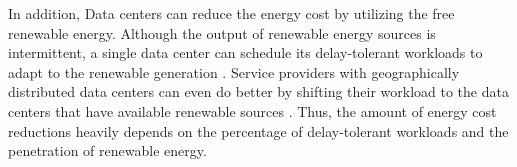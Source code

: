 In addition, Data centers can reduce the energy cost by utilizing the free renewable energy. Although the output of renewable energy sources is intermittent, a single data center can schedule its delay-tolerant workloads to adapt to the renewable generation \cite{liu2012renewable}. Service providers with geographically distributed data centers can even do better by shifting their workload to the data centers that have available renewable sources \cite{chen2012green, liu2011greening,gupta2016cool}. Thus, the amount of energy cost reductions heavily depends on the percentage of delay-tolerant workloads and the penetration of renewable energy. 


